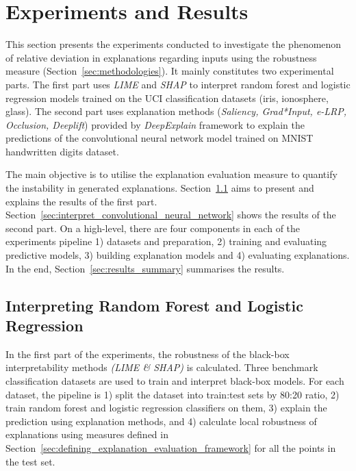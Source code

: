\documentclass[english]{tktltiki2}
\theoremstyle{definition}
\theoremstyle{remark}
\begin{document}
\section{Experiments and Results}\label{sec:experiments_and_results} %
This section presents the experiments conducted to investigate the phenomenon of relative deviation in explanations regarding inputs using the robustness measure (Section~\ref{sec:methodologies}). It mainly constitutes two experimental parts. The first part uses \textit{LIME} and \textit{SHAP} to interpret random forest and logistic regression models trained on the UCI classification datasets (iris, ionosphere, glass). The second part uses explanation methods (\textit{Saliency, Grad*Input, e-LRP, Occlusion, Deeplift}) provided by \textit{DeepExplain} framework to explain the predictions of the convolutional neural network model trained on MNIST handwritten digits dataset.

The main objective is to utilise the explanation evaluation measure to quantify the instability in generated explanations. Section~\ref{sec:interpret_radnom_forest_and_logistic_regression} aims to present and explains the results of the first part. Section~\ref{sec:interpret_convolutional_neural_network} shows the results of the second part.  On a high-level, there are four components in each of the experiments pipeline 1) datasets and preparation, 2) training and evaluating predictive models, 3) building explanation models and 4) evaluating explanations. In the end, Section~\ref{sec:results_summary} summarises the results.

\subsection{Interpreting Random Forest and Logistic Regression}\label{sec:interpret_radnom_forest_and_logistic_regression}
In the first part of the experiments, the robustness of the black-box interpretability methods \textit{(LIME \& SHAP)} is calculated. Three benchmark classification datasets are used to train and interpret black-box models. For each dataset, the pipeline is 1) split the dataset into train:test sets by 80:20 ratio, 2) train random forest and logistic regression classifiers on them, 3) explain the prediction using explanation methods, and 4) calculate local robustness of explanations using measures defined in Section~\ref{sec:defining_explanation_evaluation_framework} for all the points in the test set.
\end{document}
